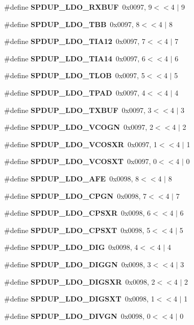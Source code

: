 \begin{DoxyCompactItemize}
\#define {\bf S\+P\+D\+U\+P\+\_\+\+L\+D\+O\+\_\+\+R\+X\+B\+UF}~0x0097, 9$<$$<$4 $\vert$  9
\item 
\#define {\bf S\+P\+D\+U\+P\+\_\+\+L\+D\+O\+\_\+\+T\+BB}~0x0097, 8$<$$<$4 $\vert$  8
\item 
\#define {\bf S\+P\+D\+U\+P\+\_\+\+L\+D\+O\+\_\+\+T\+I\+A12}~0x0097, 7$<$$<$4 $\vert$  7
\item 
\#define {\bf S\+P\+D\+U\+P\+\_\+\+L\+D\+O\+\_\+\+T\+I\+A14}~0x0097, 6$<$$<$4 $\vert$  6
\item 
\#define {\bf S\+P\+D\+U\+P\+\_\+\+L\+D\+O\+\_\+\+T\+L\+OB}~0x0097, 5$<$$<$4 $\vert$  5
\item 
\#define {\bf S\+P\+D\+U\+P\+\_\+\+L\+D\+O\+\_\+\+T\+P\+AD}~0x0097, 4$<$$<$4 $\vert$  4
\item 
\#define {\bf S\+P\+D\+U\+P\+\_\+\+L\+D\+O\+\_\+\+T\+X\+B\+UF}~0x0097, 3$<$$<$4 $\vert$  3
\item 
\#define {\bf S\+P\+D\+U\+P\+\_\+\+L\+D\+O\+\_\+\+V\+C\+O\+GN}~0x0097, 2$<$$<$4 $\vert$  2
\item 
\#define {\bf S\+P\+D\+U\+P\+\_\+\+L\+D\+O\+\_\+\+V\+C\+O\+S\+XR}~0x0097, 1$<$$<$4 $\vert$  1
\item 
\#define {\bf S\+P\+D\+U\+P\+\_\+\+L\+D\+O\+\_\+\+V\+C\+O\+S\+XT}~0x0097, 0$<$$<$4 $\vert$  0
\item 
\#define {\bf S\+P\+D\+U\+P\+\_\+\+L\+D\+O\+\_\+\+A\+FE}~0x0098, 8$<$$<$4 $\vert$  8
\item 
\#define {\bf S\+P\+D\+U\+P\+\_\+\+L\+D\+O\+\_\+\+C\+P\+GN}~0x0098, 7$<$$<$4 $\vert$  7
\item 
\#define {\bf S\+P\+D\+U\+P\+\_\+\+L\+D\+O\+\_\+\+C\+P\+S\+XR}~0x0098, 6$<$$<$4 $\vert$  6
\item 
\#define {\bf S\+P\+D\+U\+P\+\_\+\+L\+D\+O\+\_\+\+C\+P\+S\+XT}~0x0098, 5$<$$<$4 $\vert$  5
\item 
\#define {\bf S\+P\+D\+U\+P\+\_\+\+L\+D\+O\+\_\+\+D\+IG}~0x0098, 4$<$$<$4 $\vert$  4
\item 
\#define {\bf S\+P\+D\+U\+P\+\_\+\+L\+D\+O\+\_\+\+D\+I\+G\+GN}~0x0098, 3$<$$<$4 $\vert$  3
\item 
\#define {\bf S\+P\+D\+U\+P\+\_\+\+L\+D\+O\+\_\+\+D\+I\+G\+S\+XR}~0x0098, 2$<$$<$4 $\vert$  2
\item 
\#define {\bf S\+P\+D\+U\+P\+\_\+\+L\+D\+O\+\_\+\+D\+I\+G\+S\+XT}~0x0098, 1$<$$<$4 $\vert$  1
\item 
\#define {\bf S\+P\+D\+U\+P\+\_\+\+L\+D\+O\+\_\+\+D\+I\+V\+GN}~0x0098, 0$<$$<$4 $\vert$  0
\item 
$$
\end{DoxyCompactItemize}
